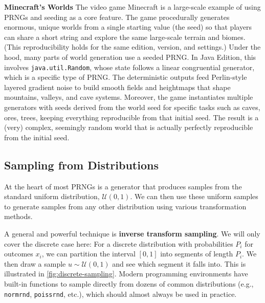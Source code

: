 \begin{exampleBox}
    \textbf{Minecraft's Worlds}
    The video game Minecraft is a large-scale example of using PRNGs and seeding as a core feature. The game procedurally generates enormous, unique worlds from a single starting value (the seed) so that players can share a short string and explore the same large-scale terrain and biomes. (This reproducibility holds for the same edition, version, and settings.) Under the hood, many parts of world generation use a seeded PRNG. In Java Edition, this involves \texttt{java.util.Random}, whose state follows a linear congruential generator, which is a specific type of PRNG. The deterministic outputs feed Perlin-style layered gradient noise to build smooth fields and heightmaps that shape mountains, valleys, and cave systems. Moreover, the game instantiates multiple generators with seeds derived from the world seed for specific tasks such as caves, ores, trees, keeping everything reproducible from that initial seed. The result is a (very) complex, seemingly random world that is actually perfectly reproducible from the initial seed.
\end{exampleBox}


\subsection{Sampling from Distributions}
At the heart of most PRNGs is a generator that produces samples from the standard uniform distribution, $\mathcal{U}(0, 1)$. We can then use these uniform samples to generate samples from any other distribution using various transformation methods.

A general and powerful technique is \textbf{inverse transform sampling}. We will only cover the discrete case here: For a discrete distribution with probabilities $P_i$ for outcomes $x_i$, we can partition the interval $[0, 1]$ into segments of length $P_i$. We then draw a sample $u \sim \mathcal{U}(0, 1)$ and see which segment it falls into. This is illustrated in \autoref{fig:discrete-sampling}. Modern programming environments have built-in functions to sample directly from dozens of common distributions (e.g., \texttt{normrnd}, \texttt{poissrnd}, etc.), which should almost always be used in practice.


